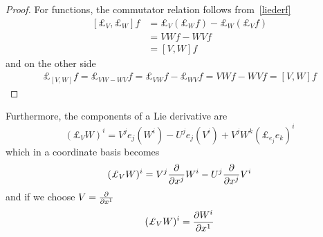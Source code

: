 \begin{proof}
        For functions, the commutator relation follows from~\eqref{liederf}
        \begin{equation*}
        \begin{aligned}
            [\pounds_V, \pounds_W] f & = \pounds_V (\pounds_W f) - \pounds_W (\pounds_V f) \\ & = V W f - W V f \\ & = [V, W] f
        \end{aligned}
        \end{equation*}
        and on the other side 
        \begin{equation*}
        \begin{aligned}
            \pounds_{[V,W]} f = \pounds_{V W - W V} f = \pounds_{VW} f - \pounds_{WV} f = VW f - WV f = [V, W] f 
        \end{aligned}
        \end{equation*}
    \end{proof}

    Furthermore, the components of a Lie derivative are 
    \begin{equation*}
        (\pounds_V W)^i = V^j e_j (W^i) - U^j e_j (V^i) + V^j W^k (\pounds_{e_j} e_k)^i
    \end{equation*}
    which in a coordinate basis becomes 
    \begin{equation}\label{liecomp}
        (\pounds_V W)^i = V^j \pdv{}{x^j} W^i - U^j \pdv{}{x^j} V^i
    \end{equation}
    and if we choose $V = \frac{\partial}{\partial x^1}$
    \begin{equation*}
        (\pounds_V W)^i = \pdv{W^i}{x^1}
    \end{equation*}

